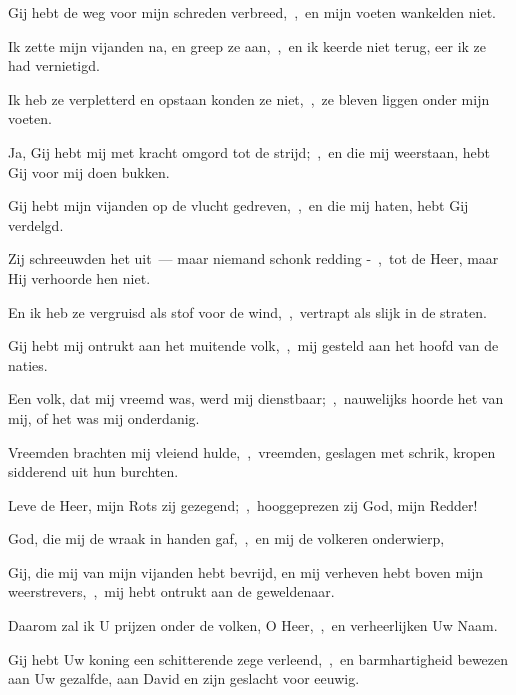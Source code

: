 \documentclass[12pt,twoside,a5paper]{article}
\begin{document}
\begin{halfparskip}
  Gij hebt de weg voor mijn schreden verbreed,~\sep\ en mijn voeten wankelden niet.

  Ik zette mijn vijanden na, en greep ze aan,~\sep\ en ik keerde niet terug, eer ik ze had vernietigd.

  Ik heb ze verpletterd en opstaan konden ze niet,~\sep\ ze bleven liggen onder mijn voeten.

  Ja, Gij hebt mij met kracht omgord tot de strijd;~\sep\ en die mij weerstaan, hebt Gij voor mij doen bukken.

  Gij hebt mijn vijanden op de vlucht gedreven,~\sep\ en die mij haten, hebt Gij verdelgd.

  Zij schreeuwden het uit~--- maar niemand schonk redding -~\sep\ tot de Heer, maar Hij verhoorde hen niet.

  En ik heb ze vergruisd als stof voor de wind,~\sep\ vertrapt als slijk in de straten.

  Gij hebt mij ontrukt aan het muitende volk,~\sep\ mij gesteld aan het hoofd van de naties.

  Een volk, dat mij vreemd was, werd mij dienstbaar;~\sep\ nauwelijks hoorde het van mij, of het was mij onderdanig.

  Vreemden brachten mij vleiend hulde,~\sep\ vreemden, geslagen met schrik, kropen sidderend uit hun burchten.

  Leve de Heer, mijn Rots zij gezegend;~\sep\ hooggeprezen zij God, mijn Redder!

  God, die mij de wraak in handen gaf,~\sep\ en mij de volkeren onderwierp,

  Gij, die mij van mijn vijanden hebt bevrijd, en mij verheven hebt boven mijn weerstrevers,~\sep\ mij hebt ontrukt aan de geweldenaar.

  Daarom zal ik U prijzen onder de volken, O Heer,~\sep\ en verheerlijken Uw Naam.

  Gij hebt Uw koning een schitterende zege verleend,~\sep\ en barmhartigheid bewezen aan Uw gezalfde, aan David en zijn geslacht voor eeuwig.
\end{halfparskip}
\end{document}
